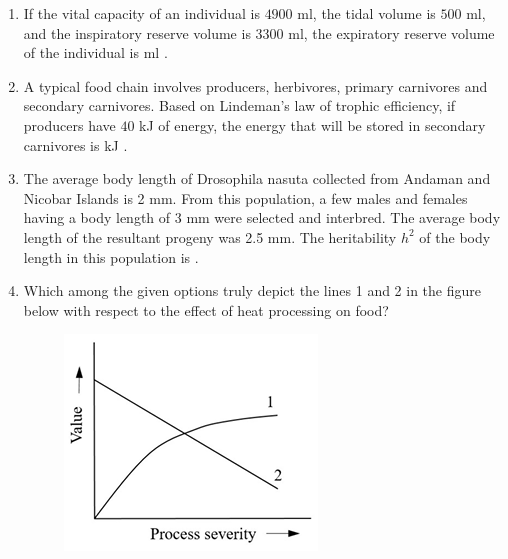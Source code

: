 \documentclass[journal,12pt,onecolumn]{IEEEtran}
\theoremstyle{remark}
\begin{document}
\begin{enumerate}
    \item If the vital capacity  of an individual is $4900$ ml, the tidal volume  is $500$ ml, and the inspiratory reserve volume  is $3300$ ml, the expiratory reserve volume  of the individual is \underline{\hspace{2cm}} ml .

    \hfill{}

    \item A typical food chain involves producers, herbivores, primary carnivores and secondary carnivores. Based on Lindeman’s law of trophic efficiency, if producers have $40$ kJ of energy, the energy that will be stored in secondary carnivores is \underline{\hspace{2cm}} kJ .

    \hfill{}

    \item The average body length of Drosophila nasuta collected from Andaman and Nicobar Islands is 2 mm. From this population, a few males and females having a body length of 3 mm were selected and interbred. The average body length of the resultant progeny was 2.5 mm. The heritability {$h^2$} of the body length in this population is \underline{\hspace{2cm}}.

    \hfill{}

    \item Which among the given options truly depict the lines 1 and 2 in the figure below with respect to the effect of heat processing on food?

    \hfill{}
    \begin{figure}[h!]
    \centering
    \includegraphics[width=0.4\columnwidth]{fig25.png}
    \caption*{}
    \label{fig:q104}
    \end{figure}
    \begin{enumerate}
    \end{enumerate}


\end{enumerate}
\end{document}
